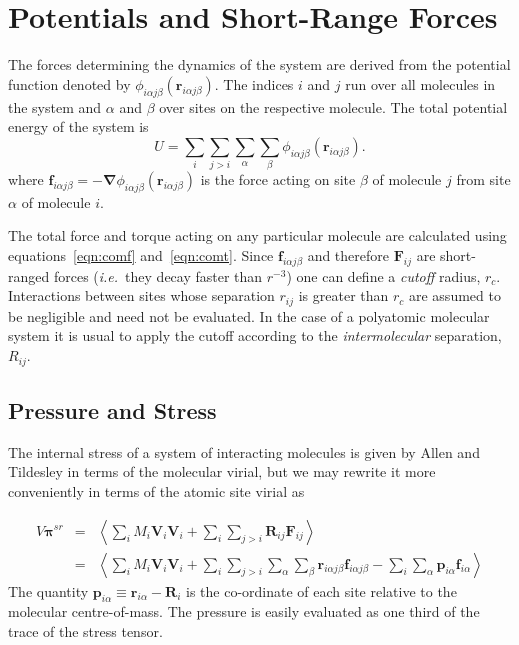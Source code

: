 \documentclass[a4paper,twoside]{report}
\providecommand{\bm}[1]{\mathbf{#1}}
\newcommand{\ie}{\emph{i.e.}}
\begin{document}
\section{Potentials and Short-Range Forces}%

The forces determining the dynamics of the system are derived from the
potential function denoted by $\phi_{i\alpha j\beta}(\bm{r} _{i\alpha
  j\beta})$.  The indices $i$ and $j$ run over all molecules in the
system and $\alpha$ and $\beta$ over sites on the respective molecule.
The total potential energy of the system is
\begin{equation}
\label{eqn:toten}
U = \sum_i \sum_{j > i} \sum_\alpha \sum_\beta \phi_{i\alpha j\beta}(
\bm{r}_{i\alpha j\beta}).
\end{equation}
where $\bm{f}_{i\alpha j\beta} = - \bm{\nabla} \phi_{i\alpha  j\beta}(
\bm{r}_{i\alpha j\beta})$ is the force acting on site $\beta$ of molecule
$j$ from site $\alpha$ of molecule $i$.

The total force and torque acting on any particular molecule are
calculated using equations~\ref{eqn:comf} and~\ref{eqn:comt}.  Since
$\bm{f}_{i\alpha j\beta}$ and therefore $\bm{F}_{ij}$ are short-ranged
forces (\ie\ they decay faster than $r^{-3}$) one can define a
\emph{cutoff} radius, $r_c$.  Interactions between sites whose
separation $r_{ij}$ is greater than $r_c$ are assumed to be negligible
and need not be evaluated.  In the case of a polyatomic molecular
system it is usual to apply the cutoff according to the
\emph{intermolecular} separation, $R_{ij}$.


\subsection{Pressure and Stress}
The internal stress of a system of interacting molecules is given by
Allen and Tildesley\cite[pp 46-49]{allen:87} in terms of the molecular
virial, but we may rewrite it more conveniently in terms of the atomic
site virial as

\begin{eqnarray}
\label{eqn:stress-sr}
V \bm{\pi}^{sr} & = & \left <  \sum_i M_i \bm{V}_i \bm{V}_i 
              + \sum_i \sum_{j>i} \bm{R}_{ij} \bm{F}_{ij} 
\right > \\ \nonumber
& = & \left < \sum_i M_i \bm{V}_i \bm{V}_i 
              + \sum_{i} \sum_{j>i} \sum_\alpha \sum_\beta 
                \bm{r}_{i\alpha j\beta}  \bm{f}_{i\alpha j\beta} 
              - \sum_i \sum_\alpha \bm{p}_{i\alpha} \bm{f}_{i\alpha}
\right >
\end{eqnarray}
The quantity $\bm{p}_{i\alpha} \equiv \bm{r}_{i\alpha} - \bm{R}_i$ is the
co-ordinate of each site relative to the molecular centre-of-mass.
The pressure is easily evaluated as one third of the trace of the
stress tensor. 
\end{document}
